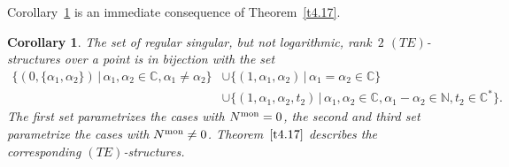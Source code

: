 \documentclass[10pt,a4paper]{amsart}
\numberwithin{equation}{section}
\numberwithin{figure}{section}
\newcommand{\N}{{\mathbb N}}
\newcommand{\C}{{\mathbb C}}
\newtheorem{Corollary}[Theorem]{Corollary}
\begin{document}
Corollary~\ref{t4.18} is an immediate consequence of
Theorem~\ref{t4.17}.

\begin{Corollary}\label{t4.18}
The set of regular singular, but not logarithmic,
rank~$2$ $(TE)$-structures over a point is in bijection
with the set
\begin{align*}
\{(0,\{\alpha_1,\alpha_2\})\,|\, \alpha_1,\alpha_2\in\C,\alpha_1\neq\alpha_2\}
&\cup\{(1,\alpha_1,\alpha_2)\,|\, \alpha_1=\alpha_2\in\C\}
\\
&\cup\{(1,\alpha_1,\alpha_2,t_2)\,|\, \alpha_1,\alpha_2\in\C,
\alpha_1-\alpha_2\in \N,t_2\in\C^*\}.
\end{align*}
The first set parametrizes the cases with $N^{\rm mon}=0$,
the second and third set parametrize the cases with
$N^{\rm mon}\neq 0$. Theorem~$\ref{t4.17}$ describes the
corresponding $(TE)$-structures.
\end{Corollary}
\end{document}
